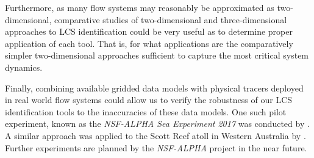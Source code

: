 Furthermore, as many flow systems may reasonably be approximated as two-dimensional, comparative studies of two-dimensional and three-dimensional approaches to LCS identification could be very useful as to determine proper application of each tool. That is, for what applications are the comparatively simpler two-dimensional approaches sufficient to capture the most critical system dynamics.

Finally, combining available gridded data models with physical tracers deployed in real world flow systems could allow us to verify the robustness of our LCS identification tools to the inaccuracies of these data models. One such pilot experiment, known as the \textit{NSF-ALPHA Sea Experiment 2017} was conducted by \cite{PeacockTracers}. A similar approach was applied to the Scott Reef atoll in Western Australia by \cite{Filippi}. Further experiments are planned by the \textit{NSF-ALPHA} project in the near future.

